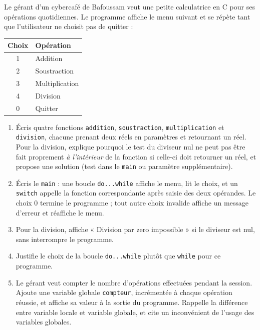 \documentclass[11pt]{article}
\begin{document}
\begin{exercice}
Le gérant d'un cybercafé de Bafoussam veut une petite calculatrice en C pour ses opérations quotidiennes. Le programme affiche le menu suivant et se répète tant que l'utilisateur ne choisit pas de quitter :
\begin{center}
\begin{tabular}{|c|l|}
\hline
\rowcolor{popblueL} \textbf{Choix} & \textbf{Opération} \\
\hline
1 & Addition \\
\hline
2 & Soustraction \\
\hline
3 & Multiplication \\
\hline
4 & Division \\
\hline
0 & Quitter \\
\hline
\end{tabular}
\end{center}
\begin{enumerate}
\item Écris quatre fonctions \texttt{addition}, \texttt{soustraction}, \texttt{multiplication} et \texttt{division}, chacune prenant deux réels en paramètres et retournant un réel. Pour la division, explique pourquoi le test du diviseur nul ne peut pas être fait proprement \emph{à l'intérieur} de la fonction si celle-ci doit retourner un réel, et propose une solution (test dans le \texttt{main} ou paramètre supplémentaire).
\item Écris le \texttt{main} : une boucle \texttt{do...while} affiche le menu, lit le choix, et un \texttt{switch} appelle la fonction correspondante après saisie des deux opérandes. Le choix $0$ termine le programme ; tout autre choix invalide affiche un message d'erreur et réaffiche le menu.
\item Pour la division, affiche « Division par zero impossible » si le diviseur est nul, sans interrompre le programme.
\item Justifie le choix de la boucle \texttt{do...while} plutôt que \texttt{while} pour ce programme.
\item Le gérant veut compter le nombre d'opérations effectuées pendant la session. Ajoute une variable globale \texttt{compteur}, incrémentée à chaque opération réussie, et affiche sa valeur à la sortie du programme. Rappelle la différence entre variable locale et variable globale, et cite un inconvénient de l'usage des variables globales.
\end{enumerate}
\end{exercice}
\end{document}
